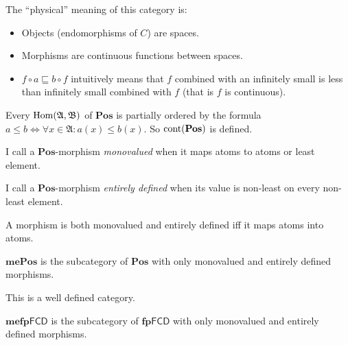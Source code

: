 \begin{rem}
  The ``physical'' meaning of this category is:
  \begin{itemize}
    \item Objects (endomorphisms of $C$) are spaces.
    
    \item Morphisms are continuous functions between spaces.
    
    \item $f \circ a \sqsubseteq b \circ f$ intuitively means that $f$
    combined with an infinitely small is less than infinitely small combined
    with $f$ (that is $f$ is continuous).
  \end{itemize}
\end{rem}

\begin{rem}
  Every $\operatorname{Hom} (\mathfrak{A}, \mathfrak{B})$ of $\mathbf{Pos}$
  is partially ordered by the formula $a \leqslant b \Leftrightarrow \forall x
  \in \mathfrak{A}: a (x) \leqslant b (x)$. So $\operatorname{cont}
  (\mathbf{Pos})$ is defined.
\end{rem}

\begin{defn}
  I call a $\mathbf{Pos}$-morphism \emph{monovalued} when it maps
  atoms to atoms or least element.
\end{defn}

\begin{defn}
  I call a $\mathbf{Pos}$-morphism \emph{entirely defined} when
  its value is non-least on every non-least element.
\end{defn}

\begin{obvious}
A morphism is both monovalued and entirely defined iff it maps atoms into
atoms.
\end{obvious}


\begin{defn}
  $\mathbf{mePos}$ is the subcategory of $\mathbf{Pos}$ with
  only monovalued and entirely defined morphisms.
\end{defn}

\begin{obvious}
This is a well defined category.{\hspace*{\fill}}{\medskip}
\end{obvious}

\begin{defn}
  $\mathbf{mefp} \mathsf{FCD}$ is the subcategory of
  $\mathbf{fp} \mathsf{FCD}$ with only monovalued and entirely
  defined morphisms.
\end{defn}


